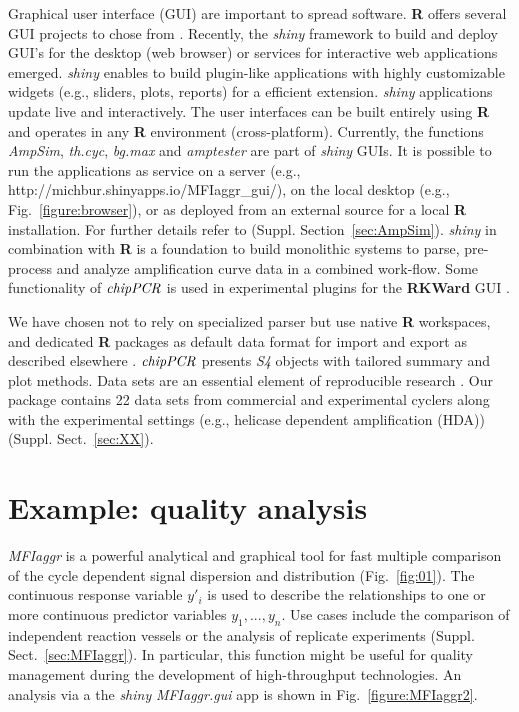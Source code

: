 \documentclass{bioinfo}
\begin{document}
\begin{methods}
Graphical user interface (GUI) are important to spread software. \textbf{R} 
offers several GUI projects to chose from \citep{rodiger_rkward_2012}. Recently, 
the \emph{shiny} \citep{shiny_2014} framework to build and deploy GUI's for the 
desktop (web browser) or services for interactive web applications emerged. 
\emph{shiny} enables to build plugin-like applications with highly customizable 
widgets (e.g., sliders, plots, reports) for a efficient extension. \emph{shiny} 
applications update live and interactively. The user interfaces can be built 
entirely using \textbf{R} and operates in any \textbf{R} environment (cross-platform). Currently, 
the functions \textsl{AmpSim}, \textsl{th.cyc}, \textsl{bg.max} and 
\textsl{amptester} are part of \emph{shiny} GUIs. It is possible to run the 
applications as service on a server (e.g., 
http://michbur.shinyapps.io/MFIaggr\_gui/), on the local desktop (e.g., 
Fig.~\ref{figure:browser}), or as deployed from an external source for a local 
\textbf{R} installation. For further details refer to  (Suppl. 
Section~\ref{sec:AmpSim}). \emph{shiny} in combination with \textbf{R} is a 
foundation to build monolithic systems to parse, pre-process and analyze 
amplification curve data in a combined work-flow. Some functionality of 
$\emph{chipPCR}$ is used in experimental plugins 
for the \textbf{RKWard} GUI \citep{pabinger_2014}. 

We have chosen not to rely on specialized parser but use native \textbf{R} 
workspaces, and dedicated \textbf{R} packages as default data format for import 
and export as described elsewhere . 
$\emph{chipPCR}$ presents \emph{S4} objects with tailored summary and plot 
methods. Data sets are an essential element of reproducible research 
\citep{Leeper_2014}. Our package contains 22 data sets from commercial and 
experimental cyclers along with the experimental settings (e.g., helicase 
dependent amplification (HDA)) (Suppl. Sect.~\ref{sec:XX}).
\end{methods}

\section{Example: quality analysis}

\textsl{MFIaggr} is a powerful analytical and graphical tool for fast multiple 
comparison of the cycle dependent signal dispersion and distribution 
(Fig.~\ref{fig:01}). The continuous response variable $y'_i$ is used to 
describe the relationships to one or more continuous predictor variables $y_1, 
..., y_n$. Use cases include the comparison of independent reaction vessels or 
the analysis of replicate experiments (Suppl. Sect.~\ref{sec:MFIaggr}). In 
particular, this function might be useful for quality management during the 
development of high-throughput technologies. An analysis via a the \emph{shiny} 
\textsl{MFIaggr.gui} app is shown in Fig.~\ref{figure:MFIaggr2}.
\end{document}
